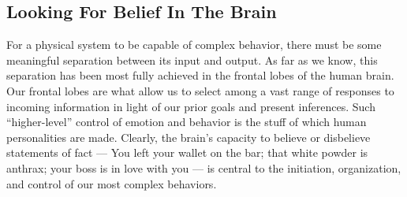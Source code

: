 \documentclass[a4paper,14pt]{extarticle}
\begin{document}
\subsection{Looking For Belief In The Brain}

For a physical system to be capable of complex behavior, there must be some meaningful separation between its input and output.
As far as we know, this separation has been most fully achieved in the frontal lobes of the human brain.
Our frontal lobes are what allow us to select among a vast range of responses to incoming information in light of our prior goals and present inferences.
Such ``higher-level'' control of emotion and behavior is the stuff of which human personalities are made.
Clearly, the brain’s capacity to believe or disbelieve statements of fact --- You left your wallet on the bar;
that white powder is anthrax;
your boss is in love with you --- is central to the initiation, organization, and control of our most complex behaviors.
\end{document}
